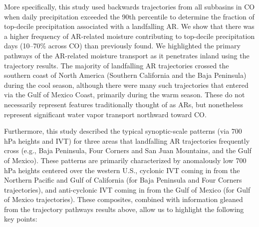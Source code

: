 \documentclass[draft]{agujournal2019}
\begin{document}

More specifically, this study used backwards trajectories from all subbasins in CO when daily precipitation exceeded the 90th percentile to determine the fraction of top-decile precipitation associated with a landfalling AR. We show that there was a higher frequency of AR-related moisture contributing to top-decile precipitation days (10--70\% across CO) than previously found. We highlighted the primary pathways of the AR-related moisture transport as it penetrates inland using the trajectory results. The majority of landfalling AR trajectories crossed the southern coast of North America (Southern California and the Baja Peninsula) during the cool season, although there were many such trajectories that entered via the Gulf of Mexico Coast, primarily during the warm season. These do not necessarily represent features traditionally thought of as ARs, but nonetheless represent significant water vapor transport northward toward CO.

Furthermore, this study described the typical synoptic-scale patterns (via 700 hPa heights and IVT) for three areas that landfalling AR trajectories frequently cross (e.g., Baja Peninsula, Four Corners and San Juan Mountains, and the Gulf of Mexico). These patterns are primarily characterized by anomalously low 700 hPa heights centered over the western U.S., cyclonic IVT coming in from the Northern Pacific and Gulf of California (for Baja Peninsula and Four Corners trajectories), and anti-cyclonic IVT coming in from the Gulf of Mexico (for Gulf of Mexico trajectories). These composites, combined with information gleaned from the trajectory pathways results above, allow us to highlight the following key points:
\end{document}
